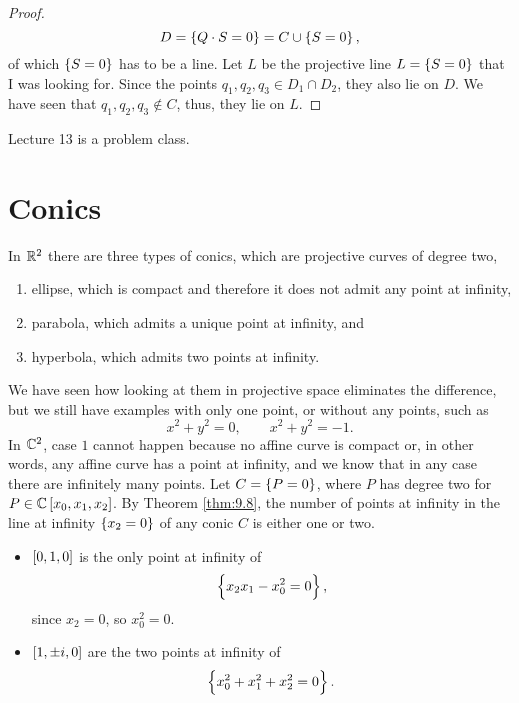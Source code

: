 \begin{proof}
$$ D = \cbr{Q \cdot S = 0} = C \cup \cbr{S = 0}, $$
of which $ \cbr{S = 0} $ has to be a line. Let $ L $ be the projective line $ L = \cbr{S = 0} $ that I was looking for. Since the points $ q_1, q_2, q_3 \in D_1 \cap D_2 $, they also lie on $ D $. We have seen that $ q_1, q_2, q_3 \notin C $, thus, they lie on $ L $.
\end{proof}


Lecture 13 is a problem class.

\pagebreak

\section{Conics}


In $ \mathbb{R}^2 $ there are three types of conics, which are projective curves of degree two,
\begin{enumerate}
\item ellipse, which is compact and therefore it does not admit any point at infinity,
\item parabola, which admits a unique point at infinity, and
\item hyperbola, which admits two points at infinity.
\end{enumerate}
We have seen how looking at them in projective space eliminates the difference, but we still have examples with only one point, or without any points, such as
$$ x^2 + y^2 = 0, \qquad x^2 + y^2 = -1. $$
In $ \mathbb{C}^2 $, case $ 1 $ cannot happen because no affine curve is compact or, in other words, any affine curve has a point at infinity, and we know that in any case there are infinitely many points. Let $ C = \cbr{P = 0} $, where $ P $ has degree two for $ P \in \C\sbr{x_0, x_1, x_2} $. By Theorem \ref{thm:9.8}, the number of points at infinity in the line at infinity $ \cbr{x_2 = 0} $ of any conic $ C $ is either one or two.

\begin{example}
\hfill
\begin{itemize}
\item $ \sbr{0, 1, 0} $ is the only point at infinity of
$$ \cbr{x_2x_1 - x_0^2 = 0}, $$
since $ x_2 = 0 $, so $ x_0^2 = 0 $.
\item $ \sbr{1, \pm i, 0} $ are the two points at infinity of
$$ \cbr{x_0^2 + x_1^2 + x_2^2 = 0}. $$
\end{itemize}
\end{example}

